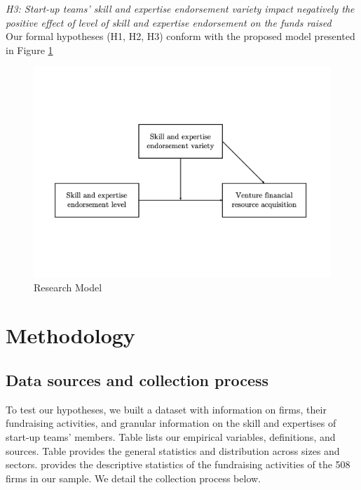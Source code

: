 \documentclass[12pt]{article}
\begin{document}
\noindent \textit{H3: Start-up teams' skill and expertise endorsement variety impact negatively the positive effect of level of skill and expertise endorsement on the funds raised} \\

Our formal hypotheses (H1, H2, H3) conform with the proposed model presented in Figure \ref{Figure1}

\begin{figure}[!b]
  \includegraphics[width=\linewidth, scale=0.5]{model.pdf}
  \caption{Research Model}
  \label{Figure1}
\end{figure}

\section{Methodology}

\subsection{Data sources and collection process}

To test our hypotheses, we built a dataset with information on firms, their fundraising activities, and granular information on the skill and expertises of start-up teams' members. Table \label{table1} lists our empirical variables, definitions, and sources. Table \label{table2} provides the general statistics and distribution across sizes and sectors. \label{table3} provides the descriptive statistics of the fundraising activities of the 508 firms in our sample. We detail the collection process below. \\
\end{document}
